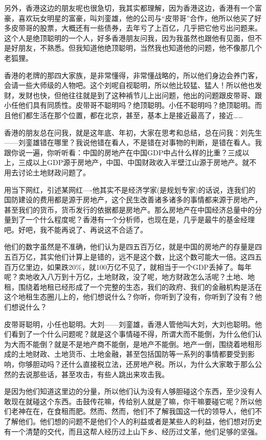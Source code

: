 \documentclass[UTF8, 12pt, a4paper]{ctexrep}
\begin{document}
另外，香港这边的朋友呢也很急切，我其实都理解，因为香港这边，香港有一个富豪，喜欢玩女明星的富豪，叫刘銮雄，他的公司与“皮带哥”合作，他所以他买了好多皮带哥的股票，大概还有一些债券，去年亏了上百亿，几乎把它他亏出问题来。这个人是绝顶聪明的一个人，好多香港朋友问我，因为我虽然也跟他有见面，但不是好朋友，不熟悉。但我知道他绝顶聪明，当然我也知道他的问题，他不像那几个老狐狸。

香港的老牌的那四大家族，是非常懂得，非常懂战略的，所以他们身边会养门客，会请一些大师级的人物吧。这个刘呢自视聪明，所以他比较猛、猛人！所以他也发财，发财也快，但他往往就是到了这种褃节儿上出问题，他出的问题跟皮带哥、跟小任他们具有同质性。皮带哥不聪明吗？绝顶聪明。小任不聪明吗？绝顶聪明。而且他们都生活在那个位置，都在北京，甚至，基本上是接近最高了，接近……

香港的朋友总在问我，就是这年底、年初，大家在思考和总结，总在问我：刘先生——刘銮雄错在哪里？我说他错在看人，不是错在对事物的判断，是错在看人。我跟你说一遍，你听听看：中国的房地产在中国GDP中占什么样的比重？三成以上，三成以上GDP源于房地产，中国、中国财政收入半壁江山源于房地产。就不用去讨论土地财政问题了。

用当下网红，引述某网红----他其实不是经济学家(是规划专家)的话说，连我们的国防建设的费用都是源于房地产，这个民生改善诸多诸多的事情都来源于房地产，甚至我们的货币，货币发行的依据都是房地产。那么房地产在中国经济总量中的分量到了一个什么程度呢？香港有一个分析师，也现在是，几乎是最牛的基金经理吧。好吧，我不能再说了、再说这不合适了。

他们的数字虽然是不准确，他们认为是四五百万亿，就是中国的房地产的存量是四五百万亿，其实他们计算上是错的，远不是这个数，比这个数可能大一倍。这四五百万亿里边，如果跌20\%，就100万亿不见了，就相当于一个GDP丢掉了。每年呢？卖地收入八万到十万亿，土地财政，没了呢，地方财政怎么活呢？土地、地租，围绕着地租已经形成了一个完整的生态，我们的政府、我们的金融机构是活在这个地租生态圈儿上的，他们想说什么？你听，你听到了没有，你听到了没有？他们想说什么？

皮带哥聪明，小任也聪明。大刘——刘銮雄，香港人管他叫大刘，大刘也聪明。他们看到了一个什么问题呢？就是这个事情碰不得，所谓大而不能倒，为什么他们认为大而不能倒？就是不是地产商不能倒，是地产不能倒。地产一倒，围绕着地租形成的土地财政、土地货币、土地金融，甚至包括国防等一系列的事情都要受到影响，你够胆动吗？还什么直接税立法，还房地产税。所以，为什么大家敢于那么公然的去说那些话，甚至攻击，有些人跳出来攻击我。

是因为他们知道这里边的分量，所以他们认为没有人够胆碰这个东西，至少没有人敢现在就碰这个东西。击鼓传花嘛，传给别人就是了嘛，你干嘛要碰它呢？所以他们老神在在，在食租而肥。然而、然而，他们不了解我国这一代的领导人，他们不了解他们。他们想的问题不是他们个人的利益或者是某些人的利益，他们想对历史有一个清楚的交代，而且这帮人经历过上山下乡、经历过文革，他们足够的坚强。
\end{document}
